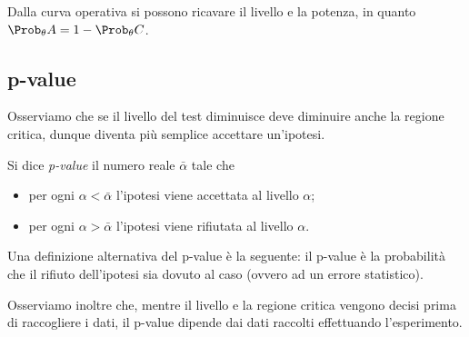 Dalla curva operativa si possono ricavare il livello e la potenza, in quanto $\Prob_{\theta}{A} = 1 -\Prob_{\theta}{C}$.

\subsection*{p-value}

Osserviamo che se il livello del test diminuisce deve diminuire anche la regione critica, dunque diventa più semplice accettare un'ipotesi.
\begin{definition}
    [p-value] Si dice \emph{p-value} il numero reale $\bar\alpha$ tale che
    \begin{itemize}
        \item  per ogni $\alpha < \bar\alpha$ l'ipotesi viene accettata al livello $\alpha$;
        \item per ogni $\alpha > \bar\alpha$ l'ipotesi viene rifiutata al livello $\alpha$.
    \end{itemize} 
\end{definition}

Una definizione alternativa del p-value è la seguente: il p-value è la probabilità che il rifiuto dell'ipotesi sia dovuto al caso (ovvero ad un errore statistico).

Osserviamo inoltre che, mentre il livello e la regione critica vengono decisi prima di raccogliere i dati, il p-value dipende dai dati raccolti effettuando l'esperimento.